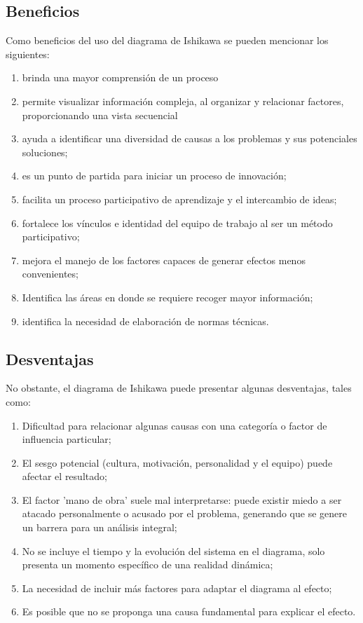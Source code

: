 \documentclass[../main]{subfiles}
\begin{document}
\subsection{Beneficios}
Como beneficios del uso del diagrama de Ishikawa se pueden mencionar
los siguientes:
\begin{enumerate}
  \item brinda una mayor comprensión de un proceso
  \item permite visualizar información compleja, al organizar y
    relacionar factores, proporcionando una vista secuencial
  \item ayuda a identificar una diversidad de causas a los problemas
    y sus potenciales soluciones;
  \item es un punto de partida para iniciar un proceso de innovación;
  \item facilita un proceso participativo de aprendizaje y el
    intercambio de ideas;
  \item fortalece los vínculos e identidad del equipo de trabajo al
    ser un método participativo;
  \item mejora el manejo de los factores capaces de generar efectos
    menos convenientes;
  \item Identifica las áreas en donde se requiere recoger mayor información;
  \item identifica la necesidad de elaboración de normas técnicas.
\end{enumerate}

\subsection{Desventajas}

No obstante, el diagrama de Ishikawa puede presentar algunas
desventajas, tales como:

\begin{enumerate}
  \item Dificultad para relacionar algunas causas con una categoría o
    factor de influencia particular;
  \item El sesgo potencial (cultura, motivación, personalidad y el
    equipo) puede afectar el resultado;
  \item El factor 'mano de obra' suele mal interpretarse: puede
    existir miedo a ser atacado personalmente o  acusado por el
    problema, generando que se genere un barrera para un análisis integral;
  \item No se incluye el tiempo y la evolución del sistema en el
    diagrama, solo presenta un momento específico de una realidad dinámica;
  \item La necesidad de incluir más factores para adaptar el diagrama al efecto;
  \item Es posible que no se proponga una causa fundamental para
    explicar el efecto.
\end{enumerate}
\end{document}

